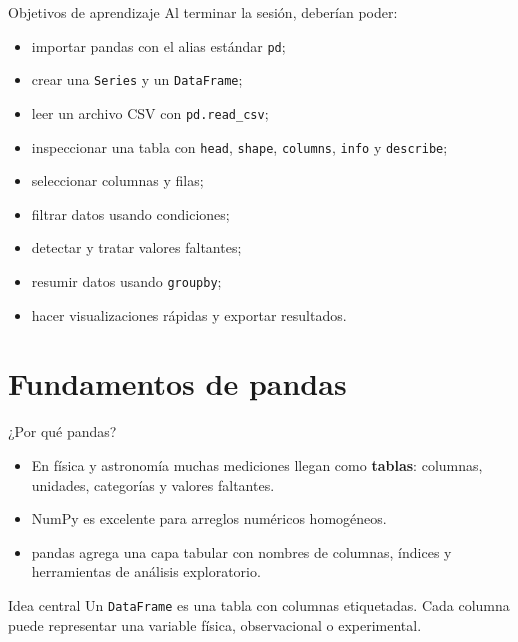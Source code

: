 \documentclass[10pt]{beamer}
\begin{document}
\begin{frame}{Objetivos de aprendizaje}
  Al terminar la sesión, deberían poder:
  \begin{itemize}
    \item importar pandas con el alias estándar \texttt{pd};
    \item crear una \texttt{Series} y un \texttt{DataFrame};
    \item leer un archivo CSV con \texttt{pd.read\_csv};
    \item inspeccionar una tabla con \texttt{head}, \texttt{shape}, \texttt{columns}, \texttt{info} y \texttt{describe};
    \item seleccionar columnas y filas;
    \item filtrar datos usando condiciones;
    \item detectar y tratar valores faltantes;
    \item resumir datos usando \texttt{groupby};
    \item hacer visualizaciones rápidas y exportar resultados.
  \end{itemize}
\end{frame}

\section{Fundamentos de pandas}

\begin{frame}{¿Por qué pandas?}
  \begin{itemize}
    \item En física y astronomía muchas mediciones llegan como \textbf{tablas}: columnas, unidades, categorías y valores faltantes.
    \item NumPy es excelente para arreglos numéricos homogéneos.
    \item pandas agrega una capa tabular con nombres de columnas, índices y herramientas de análisis exploratorio.
  \end{itemize}

  \begin{block}{Idea central}
    Un \texttt{DataFrame} es una tabla con columnas etiquetadas. Cada columna puede representar una variable física, observacional o experimental.
  \end{block}
\end{frame}
\end{document}
